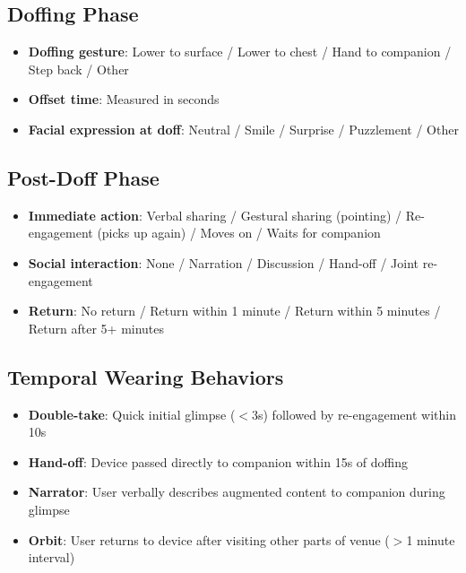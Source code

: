 \subsection{Doffing Phase}
\begin{itemize}
    \item \textbf{Doffing gesture}: Lower to surface / Lower to chest / Hand to companion / Step back / Other
    \item \textbf{Offset time}: Measured in seconds
    \item \textbf{Facial expression at doff}: Neutral / Smile / Surprise / Puzzlement / Other
\end{itemize}

\subsection{Post-Doff Phase}
\begin{itemize}
    \item \textbf{Immediate action}: Verbal sharing / Gestural sharing (pointing) / Re-engagement (picks up again) / Moves on / Waits for companion
    \item \textbf{Social interaction}: None / Narration / Discussion / Hand-off / Joint re-engagement
    \item \textbf{Return}: No return / Return within 1 minute / Return within 5 minutes / Return after 5+ minutes
\end{itemize}

\subsection{Temporal Wearing Behaviors}
\begin{itemize}
    \item \textbf{Double-take}: Quick initial glimpse ($<$3s) followed by re-engagement within 10s
    \item \textbf{Hand-off}: Device passed directly to companion within 15s of doffing
    \item \textbf{Narrator}: User verbally describes augmented content to companion during glimpse
    \item \textbf{Orbit}: User returns to device after visiting other parts of venue ($>$1 minute interval)
\end{itemize}
